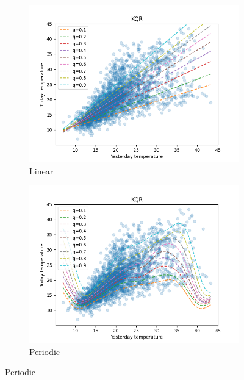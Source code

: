\begin{figure}[!h]\ContinuedFloat
    \begin{subfigure}[b]{0.5\linewidth}
        \centering
        \includegraphics[width=1.1\textwidth]{images/melbourne_linear_kernel_quantile_regression.png}
        \caption{Linear} 
        \label{} 
        \vspace{4ex}
    \end{subfigure} 
    \begin{subfigure}[b]{0.5\linewidth}
        \centering
        \includegraphics[width=1.1\textwidth]{images/melbourne_periodic_kernel_quantile_regression.png}
        \caption{Periodic} 
        \label{} 
        \vspace{4ex}

\end{subfigure}
\end{figure}
